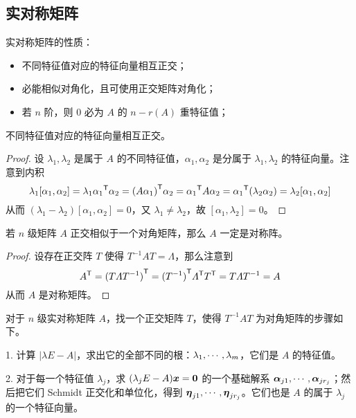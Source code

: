 \subsection{实对称矩阵}

实对称矩阵的性质：
\begin{itemize}
	\item 不同特征值对应的特征向量相互正交；
	\item 必能相似对角化，且可使用正交矩阵对角化；
	\item 若 $n$ 阶，则 $0$ 必为 $A$ 的 $n-r(A)$ 重特征值；
\end{itemize}

\begin{theorem}
	不同特征值对应的特征向量相互正交。
\end{theorem}

\begin{proof}
	设 $\lambda_1, \lambda_2$ 是属于 $A$ 的不同特征值，$\alpha_1, \alpha_2$ 是分属于 $\lambda_1, \lambda_2$ 的特征向量。注意到内积
	\[ \lambda_1 [\alpha_1, \alpha_2] = \lambda_1 {\alpha_1}^\mathsf{T} \alpha_2 = {(A \alpha_1)}^\mathsf{T} \alpha_2 = {\alpha_1}^\mathsf{T} A \alpha_2 = {\alpha_1}^\mathsf{T} (\lambda_2 \alpha_2) = \lambda_2 [\alpha_1, \alpha_2] \]
	从而 $(\lambda_1 - \lambda_2)[\alpha_1, \alpha_2] = 0$，又 $\lambda_1 \neq \lambda_2$，故 $[\alpha_1, \lambda_2] = 0$。
\end{proof}

\begin{theorem}
	若 $n$ 级矩阵 $A$ 正交相似于一个对角矩阵，那么 $A$ 一定是对称阵。
\end{theorem}

\begin{proof}
	设存在正交阵 $T$ 使得 $T^{-1}AT = \varLambda$，那么注意到
	\[ {A}^\mathsf{T} = {(T\varLambda T^{-1})}^\mathsf{T} = {(T^{-1})}^\mathsf{T}{\varLambda}^\mathsf{T}{T}^\mathsf{T} = T \varLambda T^{-1} = A \]
	从而 $A$ 是对称矩阵。
\end{proof}

对于 $n$ 级实对称矩阵 $A$，找一个正交矩阵 $T$，使得 $T^{-1}AT$ 为对角矩阵的步骤如下。

1. 计算 $|\lambda E- A|$，求出它的全部不同的根：$\lambda_1,\cdots,\lambda_m$，它们是 $A$ 的特征值。

2. 对于每一个特征值 $\lambda_j$，求 $(\lambda_jE-A)\boldsymbol{x} = \boldsymbol{0}$ 的一个基础解系 $\boldsymbol{\alpha}_{j1},\cdots,\boldsymbol{\alpha}_{jr_j}$；然后把它们 Schmidt 正交化和单位化，得到 $\boldsymbol{\eta}_{j1},\cdots,\boldsymbol{\eta}_{jr_j}$。它们也是 $A$ 的属于 $\lambda_j$ 的一个特征向量。

